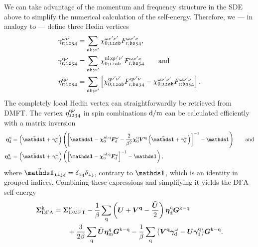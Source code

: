 \documentclass[../../main.tex]{subfiles}
\begin{document}
We can take advantage of the momentum and frequency structure in the SDE above to simplify the numerical calculation of the self-energy. Therefore, we --- in analogy to \cite{ab initio dga} --- define three Hedin vertices
\begin{align}\label{eq:three_leg_vertices_abinitio_dga}
	\gamma_{\text{r};\mathfrak{1234}}^{\omega\nu}&=\sum_{\mathfrak{ab;\nu'}}\chi_{0;\mathfrak{12ab}}^{\omega\nu'\nu'}F_{\text{r};\mathfrak{ba34}}^{\omega\nu'\nu},\\
	\gamma_{\text{r};\mathfrak{1234}}^{\text{q}\nu}&=\sum_{\mathfrak{ab;\nu'}}\chi_{0;\mathfrak{12ab}}^{\text{nl};\text{q}\nu'\nu'}F_{\text{r};\mathfrak{ba34}}^{\omega\nu'\nu}\qquad\text{and}\\
	\eta_{\text{r};\mathfrak{1234}}^{\text{q}\nu}&=\sum_{\mathfrak{ab;\nu'}}\left [\chi_{0;\mathfrak{12ab}}^{\text{q}\nu'\nu'}F_{\text{r};\mathfrak{ba34}}^{\text{q}\nu'\nu}-\chi_{0;\mathfrak{12ab}}^{\omega\nu'\nu'}F_{\text{r};\mathfrak{ba34}}^{\omega\nu'\nu}\right ].
\end{align}
The completely local Hedin vertex can straightforwardly be retrieved from DMFT. The vertex $\eta_{\mathfrak{1234}}^{\text{q}\nu}$ in spin combinations $\text{d}/\text{m}$ can be calculated efficiently with a matrix inversion
\begin{subequations}
\begin{align}
	\bm\eta_{\dens}^{\q}&=\left (\vec{\bm\unity}+\bm\gamma_{\dens}^{\omega}\right )\left (\left [\bm\unity-\bm\chi_{0}^{\nl;\q}\bm F_{\dens}^{\omega}-\frac{2}{\beta^2}\bm\chi_{0}^{\q}\bm V^{\vv{q}}\left (\vec{\bm\unity}+\bm\gamma_{\dens}^{\omega}\right )\right ]^{-1}-\bm\unity\right )\qqand\\
	\bm\eta_{\magn}^{\q}&=\left (\vec{\bm\unity}+\bm\gamma_{\magn}^{\omega}\right )\left (\left [\bm\unity-\bm\chi_{0}^{\nl;\q}\bm F_{\dens}^{\omega}\right ]^{-1}-\bm\unity\right ),
\end{align}
\end{subequations}
where $\vec{\bm\unity}_{\mathfrak{1234}}=\delta_{\mathfrak{14}}\delta_{\mathfrak{23}}$, contrary to $\bm\unity$, which is an identity in grouped indices. Combining these expressions and simplifying it \cite{ab initio dga} yields the $\text{D}\Gamma\text{A}$ self-energy
\begin{align}\label{eq:sde_abinitio_dga}
\begin{split}
	\bm\Sigma_{\text{D}\Gamma\text{A}}^{\text{k}}&=\bm\Sigma_{\text{DMFT}}^{\nu}-\frac1\beta\sum_{\text{q}}\left (\bm U + \bm V^{\textbf{q}}-\frac{\tilde{\bm U}}{2}\right )\bm\eta_{\text{d}}^{\text{q}}\bm G^{\text{k}-\text{q}}\\
	&\qquad+\frac{3}{2\beta}\sum_{\text{q}}\tilde{\bm U}\bm\eta_{\text{m}}^{q}\bm G^{\text{k}-\text{q}}-\frac1\beta\sum_{\text{q}}\big (\bm V^{\textbf{q}}\bm\gamma_{\text{d}}^{\omega}-\bm U\bm\gamma_{\text{d}}^{\text{q}}\big )\bm G^{\text{k}-\text{q}}.
\end{split}
\end{align}
\end{document}
